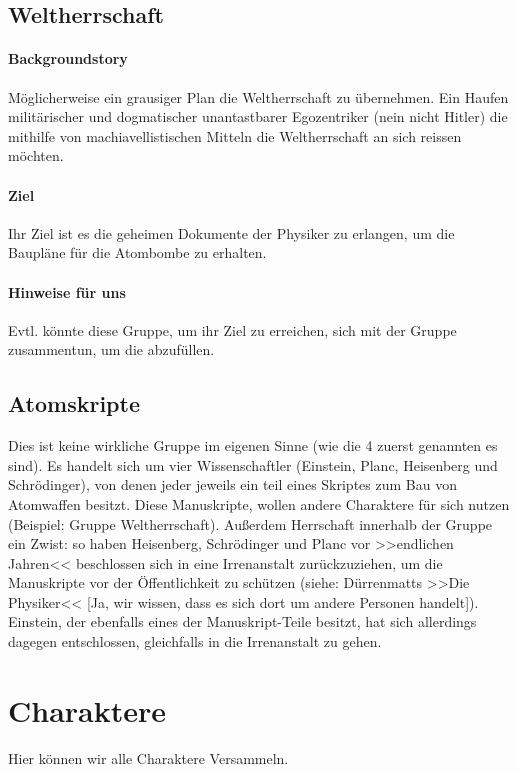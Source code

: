 \documentclass[12pt, a4paper, openany]{report}
\begin{document}
\section{Weltherrschaft}
\subsubsection{Backgroundstory}
Möglicherweise ein grausiger Plan die Weltherrschaft zu übernehmen. 
Ein Haufen militärischer und dogmatischer unantastbarer Egozentriker (nein nicht Hitler) die mithilfe von machiavellistischen Mitteln die Weltherrschaft an sich reissen möchten. 

\subsubsection{Ziel}
Ihr Ziel ist es die geheimen Dokumente der Physiker zu erlangen, um die Baupläne für die Atombombe zu erhalten.

\subsubsection{Hinweise für uns}
Evtl. könnte diese Gruppe, um ihr Ziel zu erreichen, sich mit der Gruppe  zusammentun, um die abzufüllen.

\section{Atomskripte}
Dies ist keine wirkliche Gruppe im eigenen Sinne (wie die 4 zuerst genannten es sind). 
Es handelt sich um vier Wissenschaftler (Einstein, Planc, Heisenberg und Schrödinger), von denen jeder jeweils ein teil eines Skriptes zum Bau von Atomwaffen besitzt.
Diese Manuskripte, wollen andere Charaktere für sich nutzen (Beispiel: Gruppe Weltherrschaft).
Außerdem Herrschaft innerhalb der Gruppe ein Zwist: 
so haben Heisenberg, Schrödinger und Planc vor >>endlichen Jahren<< beschlossen sich in eine Irrenanstalt zurückzuziehen, um die Manuskripte vor der Öffentlichkeit zu schützen (siehe: Dürrenmatts >>Die Physiker<< [Ja, wir wissen, dass es sich dort um andere Personen handelt]).
Einstein, der ebenfalls eines der Manuskript-Teile besitzt, hat sich allerdings dagegen entschlossen, gleichfalls in die Irrenanstalt zu gehen.

\chapter{Charaktere}
Hier können wir alle Charaktere Versammeln.
\end{document}
